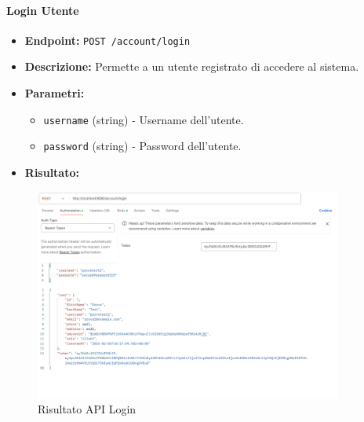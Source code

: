 \paragraph{Login Utente}
\begin{itemize}
    \item \textbf{Endpoint:} \texttt{POST /account/login}
    \item \textbf{Descrizione:} Permette a un utente registrato di accedere al sistema.
    \item \textbf{Parametri:}
    \begin{itemize}
        \item \texttt{username} (string) - Username dell'utente.
        \item \texttt{password} (string) - Password dell'utente.
    \end{itemize}
    \item \textbf{Risultato:}  
\end{itemize}
\begin{figure}[H]
    \centering
    \includegraphics[width=0.9\textwidth]{images/loginapi.png}
    \caption{Risultato API Login}
    \label{fig:api_login}
\end{figure}

